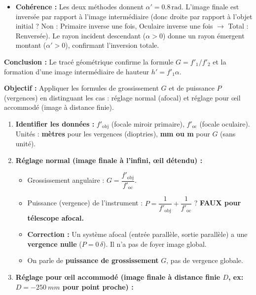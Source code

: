 \documentclass[11pt]{article}
\begin{document}
\begin{exoresolu}
\begin{enumerate}
\begin{itemize}
\[        \]
        \item \textbf{Cohérence :} Les deux méthodes donnent $\alpha' = \num{0,8}\,\text{rad}$. L'image finale est inversée par rapport à l'image intermédiaire (donc droite par rapport à l'objet initial ? Non : Primaire inverse une fois, Oculaire inverse une fois $\rightarrow$ Total : Renversée). Le rayon incident descendant ($\alpha>0$) donne un rayon émergent montant ($\alpha'>0$), confirmant l'inversion totale.
    \end{itemize}
    \textbf{Conclusion :} Le tracé géométrique confirme la formule $G = f'_1/f'_2$ et la formation d'une image intermédiaire de hauteur $h' = f'_1 \alpha$.
\end{enumerate}
\end{exoresolu}

\begin{methode}
\textbf{Objectif :} Appliquer les formules de grossissement $G$ et de puissance $P$ (vergences) en distinguant les cas : réglage normal (afocal) et réglage pour œil accommodé (image à distance finie).
\begin{enumerate}
    \item \textbf{Identifier les données :} $f'_{\text{obj}}$ (focale miroir primaire), $f'_{\text{oc}}$ (focale oculaire). Unités : \textbf{mètres} pour les vergences (dioptries), \textbf{mm ou m} pour $G$ (sans unité).
    \item \textbf{Réglage normal (image finale à l'infini, œil détendu) :}
    \begin{itemize}
        \item Grossissement angulaire : $\boxed{G = \dfrac{f'_{\text{obj}}}{f'_{\text{oc}}}}$.
        \item Puissance (vergence) de l'instrument : $\boxed{P = \dfrac{1}{f'_{\text{obj}}} + \dfrac{1}{f'_{\text{oc}}}}$ ? \textbf{FAUX pour télescope afocal.}
        \item \textbf{Correction :} Un système afocal (entrée parallèle, sortie parallèle) a une \textbf{vergence nulle} ($P=0\,\delta$). Il n'a pas de foyer image global.
        \item On parle de \textbf{puissance de grossissement} $G$, pas de vergence globale.
    \end{itemize}
    \item \textbf{Réglage pour œil accommodé (image finale à distance finie $D$, ex: $D = -\SI{250}{mm}$ pour point proche) :}
    \begin{itemize}

\end{itemize}
\end{enumerate}
\end{methode}
\end{document}

